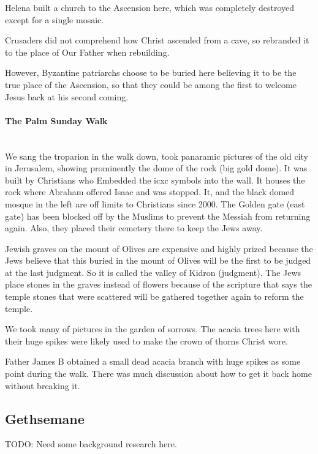 \documentclass[letterpaper]{report}
\begin{document}
\begin{multicols}{2}
Helena built a church to the Ascension here, which was completely destroyed except for a single mosaic.

Crusaders did not comprehend how Christ ascended from a cave, so rebranded it to the place of Our Father when rebuilding.

However, Byzantine patriarchs choose to be buried here believing it to be the true place of the Ascension, so that they could be among the first to welcome Jesus back at his second coming.

\paragraph{The Palm Sunday Walk}\mbox{}\\
We sang the troparion in the walk down, took panaramic pictures of the old city in Jerusalem, showing prominently the dome of the rock (big gold dome).
It was built by Christians who Embedded the icxc symbols into the wall. It houses the rock where Abraham offered Isaac and was stopped. It, and the black domed mosque in the left are off limits to Christians since 2000.
The Golden gate (east gate) has been blocked off by the Muslims to prevent the Messiah from returning again. Also, they placed their cemetery there to keep the Jews away.

Jewish graves on the mount of Olives are expensive and highly prized because the Jews believe that this buried in the mount of Olives will be the first to be judged at the last judgment. So it is called the valley of Kidron (judgment). The Jews place stones in the graves instead of flowers because of the scripture that says the temple stones that were scattered will be gathered together again to reform the temple. 

We took many of pictures in the garden of sorrows.
The acacia trees here with their huge spikes were likely used to make the crown of thorns Christ wore.

Father James B obtained a small dead acacia branch with huge spikes as some point during the walk.
There was much discussion about how to get it back home without breaking it.

\end{multicols}

\clearpage
\subsection{Gethsemane}
\begin{multicols}{2}
	TODO: Need some background research here.
\end{multicols}
\end{document}
